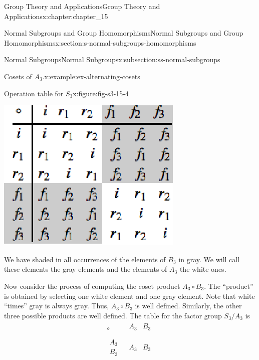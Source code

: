 \documentclass[oneside,10pt,]{book}
\numberwithin{equation}{section}
\begin{document}
\begin{chapterptx}{Group Theory and Applications}{}{Group Theory and Applications}{}{}{x:chapter:chapter_15}
\begin{sectionptx}{Normal Subgroups and Group Homomorphisms}{}{Normal Subgroups and Group Homomorphisms}{}{}{x:section:s-normal-subgroups-homomorphisms}
\begin{subsectionptx}{Normal Subgroups}{}{Normal Subgroups}{}{}{x:subsection:ss-normal-subgroups}
\begin{example}{Cosets of \(A_3\).}{x:example:ex-alternating-cosets}
\begin{figureptx}{Operation table for \(S_3\)}{x:figure:fig-s3-15-4}{}%
\begin{image}{0.1}{0.8}{0.1}%
\includegraphics[width=\linewidth]{images/fig-s3-15-4.png}
\end{image}%
\tcblower
\end{figureptx}%
We have shaded in all occurrences of the elements of \(B_3\) in gray. We will call these elements the gray elements and the elements of \(A_3\) the white ones.%
\par
Now consider the process of computing the coset product \(A_3\circ B_3\). The  ``product'' is obtained by selecting one white element and one gray element. Note that white ``times'' gray is always gray. Thus, \(A_3\circ B_3\) is well defined. Similarly, the other three possible products are well defined. The table for the factor group \(S_3/A_3\) is%
\begin{equation*}
\begin{array}{c|c}
\circ  & 
\begin{array}{cc}
A_3 & B_3 \\
\end{array}
\\
\hline
\begin{array}{c}
A_{3 } \\
B_3 \\
\end{array}
& 
\begin{array}{cc}
A_3 & B_3 \\

\end{array}
\end{array}
\end{equation*}
\end{example}
\end{subsectionptx}
\end{sectionptx}
\end{chapterptx}
\end{document}
